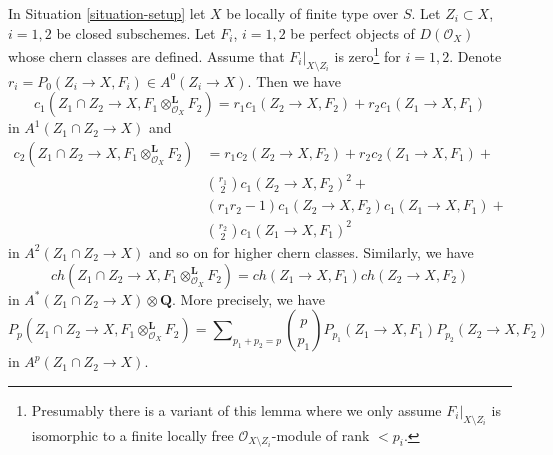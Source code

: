 \begin{lemma}
\label{lemma-loc-chern-tensor-product}
In Situation \ref{situation-setup} let $X$ be locally of finite type over $S$.
Let $Z_i \subset X$, $i = 1, 2$ be closed subschemes. Let $F_i$, $i = 1, 2$
be perfect objects of $D(\mathcal{O}_X)$ whose chern classes are defined.
Assume that $F_i|_{X \setminus Z_i}$ is zero\footnote{Presumably there
is a variant of this lemma where we only assume $F_i|_{X \setminus Z_i}$
is isomorphic to a finite locally free $\mathcal{O}_{X \setminus Z_i}$-module
of rank $< p_i$.} for $i = 1, 2$. Denote
$r_i = P_0(Z_i \to X, F_i) \in A^0(Z_i \to X)$.
Then we have
$$
c_1(Z_1 \cap Z_2 \to X, F_1 \otimes_{\mathcal{O}_X}^\mathbf{L} F_2) =
r_1 c_1(Z_2 \to X, F_2) + r_2 c_1(Z_1 \to X, F_1)
$$
in $A^1(Z_1 \cap Z_2 \to X)$ and
\begin{align*}
c_2(Z_1 \cap Z_2 \to X, F_1 \otimes_{\mathcal{O}_X}^\mathbf{L} F_2)
& =
r_1 c_2(Z_2 \to X, F_2) +
r_2 c_2(Z_1 \to X, F_1) + \\
& {r_1 \choose 2} c_1(Z_2 \to X, F_2)^2 + \\
& (r_1r_2 - 1) c_1(Z_2 \to X, F_2)c_1(Z_1 \to X, F_1) + \\
& {r_2 \choose 2} c_1(Z_1 \to X, F_1)^2
\end{align*}
in $A^2(Z_1 \cap Z_2 \to X)$ and so on for higher chern classes.
Similarly, we have
$$
ch(Z_1 \cap Z_2 \to X, F_1 \otimes_{\mathcal{O}_X}^\mathbf{L} F_2) =
ch(Z_1 \to X, F_1) ch(Z_2 \to X, F_2)
$$
in $A^*(Z_1 \cap Z_2 \to X) \otimes \mathbf{Q}$. More precisely, we have
$$
P_p(Z_1 \cap Z_2 \to X, F_1 \otimes_{\mathcal{O}_X}^\mathbf{L} F_2) =
\sum\nolimits_{p_1 + p_2 = p}
{p \choose p_1} P_{p_1}(Z_1 \to X, F_1) P_{p_2}(Z_2 \to X, F_2)
$$
in $A^p(Z_1 \cap Z_2 \to X)$.
\end{lemma}

